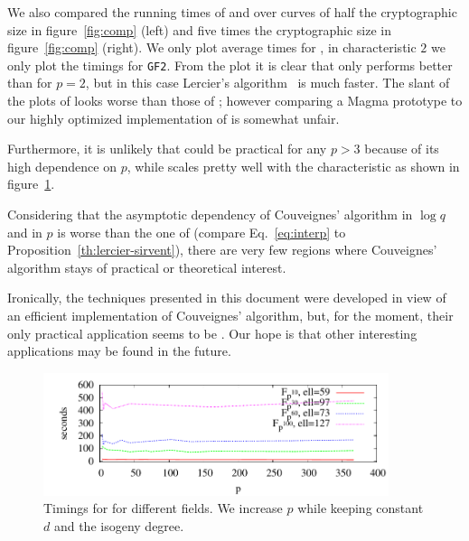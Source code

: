 We also compared the running times of \ctwoasfimc{} and
 over curves of half the cryptographic size in
figure~\ref{fig:comp} (left) and five times the cryptographic size in
figure~\ref{fig:comp} (right). We only plot average times for \ctwo{},
in characteristic $2$ we only plot the timings for \texttt{GF2}. From
the plot it is clear that \ctwoasfimc{} only performs better than
 for $p=2$, but in this case Lercier's
algorithm~\cite{lercier96} is much faster.  The slant of the plots of
 looks worse than those of \ctwoasfimc{}; however
comparing a Magma prototype to our highly optimized implementation of
\ctwoasfimc{} is somewhat unfair.

Furthermore, it is unlikely that \ctwoasfimc{} could be practical for
any $p>3$ because of its high dependence on $p$, while
 scales pretty well with the characteristic as
shown in figure~\ref{fig:LSp}.

Considering that the asymptotic dependency of Couveignes' algorithm in
$\log q$ and in $p$ is worse than the one of 
(compare Eq.~\eqref{eq:interp} to
Proposition~\ref{th:lercier-sirvent}), there are very few regions
where Couveignes' algorithm stays of practical or theoretical
interest.

  Ironically, the
techniques presented in this document were developed in view of an
efficient implementation of Couveignes' algorithm, but, for the
moment, their only practical application seems to be \ctwoud{}. Our hope
is that other interesting applications may be found in the future.

\begin{figure}
  \centering
  \includegraphics[width=0.9\textwidth]{isogeny/LSp}
  \caption{Timings for  for different fields. We
    increase $p$ while keeping constant $d$ and the isogeny degree.}
  \label{fig:LSp}
\end{figure}


%
